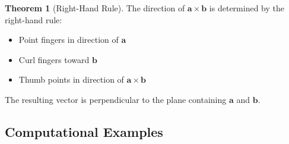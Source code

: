 \documentclass[12pt,a4paper]{article}
\theoremstyle{definition}
\newtheorem{theorem}{Theorem}[section]
\begin{document}
\begin{theorem}[Right-Hand Rule]
The direction of $\mathbf{a} \times \mathbf{b}$ is determined by the right-hand rule:
\begin{itemize}
    \item Point fingers in direction of $\mathbf{a}$
    \item Curl fingers toward $\mathbf{b}$
    \item Thumb points in direction of $\mathbf{a} \times \mathbf{b}$
\end{itemize}

The resulting vector is perpendicular to the plane containing $\mathbf{a}$ and $\mathbf{b}$.
\end{theorem}

\subsection{Computational Examples}
\end{document}
